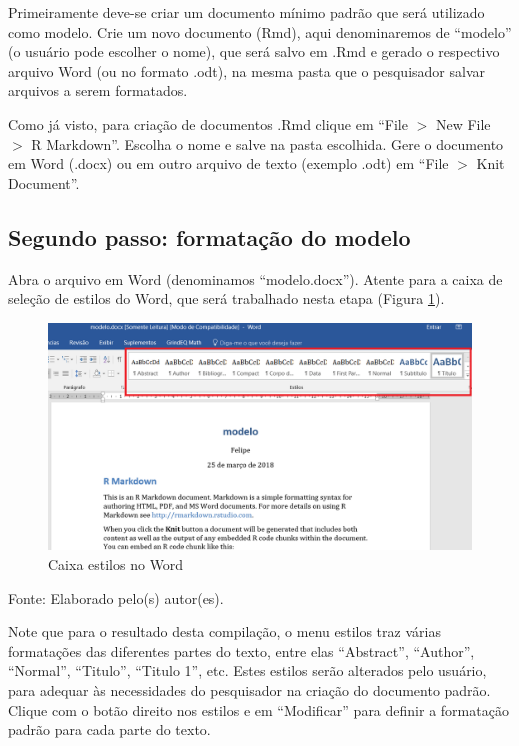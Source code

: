 \documentclass[12pt,brazil,oneside]{book}
\begin{document}
Primeiramente deve-se criar um documento mínimo padrão que será
utilizado como modelo. Crie um novo documento (Rmd), aqui denominaremos
de ``modelo'' (o usuário pode escolher o nome), que será salvo em .Rmd e
gerado o respectivo arquivo Word (ou no formato .odt), na mesma pasta
que o pesquisador salvar arquivos a serem formatados.

Como já visto, para criação de documentos .Rmd clique em ``File \(>\)
New File \(>\) R Markdown''. Escolha o nome e salve na pasta escolhida.
Gere o documento em Word (.docx) ou em outro arquivo de texto (exemplo
.odt) em ``File \(>\) Knit Document''.

\hypertarget{segundo-passo-formatacao-do-modelo}{%
\subsection{Segundo passo: formatação do
modelo}\label{segundo-passo-formatacao-do-modelo}}

Abra o arquivo em Word (denominamos ``modelo.docx''). Atente para a
caixa de seleção de estilos do Word, que será trabalhado nesta etapa
(Figura \ref{fig:rmarkestilos}).

\begin{figure}[H]

{\centering \includegraphics[width=0.8\linewidth]{rmarkestilos} 

}

\caption{Caixa estilos no Word}\label{fig:rmarkestilos}
\end{figure}

Fonte: Elaborado pelo(s) autor(es).

Note que para o resultado desta compilação, o menu estilos traz várias
formatações das diferentes partes do texto, entre elas ``Abstract'',
``Author'', ``Normal'', ``Titulo'', ``Titulo 1'', etc. Estes estilos
serão alterados pelo usuário, para adequar às necessidades do
pesquisador na criação do documento padrão. Clique com o botão direito
nos estilos e em ``Modificar'' para definir a formatação padrão para
cada parte do texto.
\end{document}

